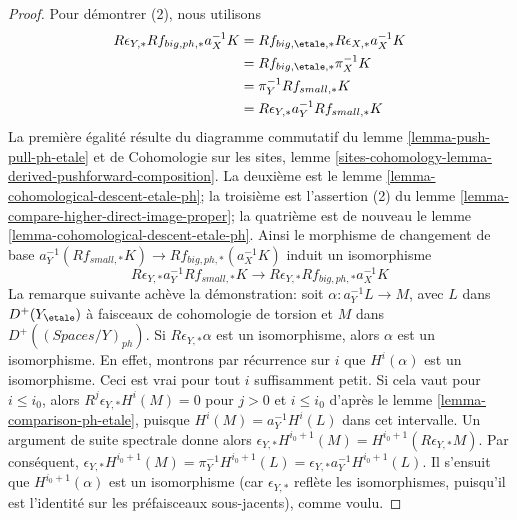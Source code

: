\begin{proof}
\medskip\noindent
Pour démontrer (2), nous utilisons
\begin{align*}
R\epsilon_{Y, *}Rf_{big, ph, *}a_X^{-1}K
& =
Rf_{big, \etale, *}R\epsilon_{X, *}a_X^{-1}K \\
& =
Rf_{big, \etale, *}\pi_X^{-1}K \\
& =
\pi_Y^{-1}Rf_{small, *}K \\
& =
R\epsilon_{Y, *} a_Y^{-1}Rf_{small, *}K
\end{align*}
La première égalité résulte du diagramme commutatif du lemme
\ref{lemma-push-pull-ph-etale} et de Cohomologie sur les sites, lemme
\ref{sites-cohomology-lemma-derived-pushforward-composition}.
La deuxième est le lemme \ref{lemma-cohomological-descent-etale-ph}; la
troisième est l'assertion (2) du lemme
\ref{lemma-compare-higher-direct-image-proper}; la quatrième est de nouveau
le lemme \ref{lemma-cohomological-descent-etale-ph}.
Ainsi le morphisme de changement de base
$a_Y^{-1}(Rf_{small, *}K) \to Rf_{big, ph, *}(a_X^{-1}K)$
induit un isomorphisme
$$
R\epsilon_{Y, *}a_Y^{-1}Rf_{small, *}K \to
R\epsilon_{Y, *}Rf_{big, ph, *}a_X^{-1}K
$$
La remarque suivante achève la démonstration: soit
$\alpha : a_Y^{-1}L \to M$, avec $L$ dans $D^+(Y_\etale)$ à faisceaux de
cohomologie de torsion et $M$ dans $D^+((\textit{Spaces}/Y)_{ph})$.
Si $R\epsilon_{Y, *}\alpha$ est un isomorphisme, alors $\alpha$ est un
isomorphisme. En effet, montrons par récurrence sur $i$ que $H^i(\alpha)$ est un
isomorphisme. Ceci est vrai pour tout $i$ suffisamment petit. Si cela vaut pour
$i \leq i_0$, alors $R^j\epsilon_{Y, *}H^i(M) = 0$ pour $j > 0$ et
$i \leq i_0$ d'après le lemme \ref{lemma-comparison-ph-etale}, puisque
$H^i(M) = a_Y^{-1}H^i(L)$ dans cet intervalle. Un argument de suite spectrale
donne alors
$\epsilon_{Y, *}H^{i_0 + 1}(M) = H^{i_0 + 1}(R\epsilon_{Y, *}M)$.
Par conséquent, $\epsilon_{Y, *}H^{i_0 + 1}(M) =
\pi_Y^{-1}H^{i_0 + 1}(L) =
\epsilon_{Y, *}a_Y^{-1}H^{i_0 + 1}(L)$. Il s'ensuit que
$H^{i_0 + 1}(\alpha)$ est un isomorphisme (car $\epsilon_{Y, *}$ reflète les
isomorphismes, puisqu'il est l'identité sur les préfaisceaux sous-jacents),
comme voulu.
\end{proof}



















